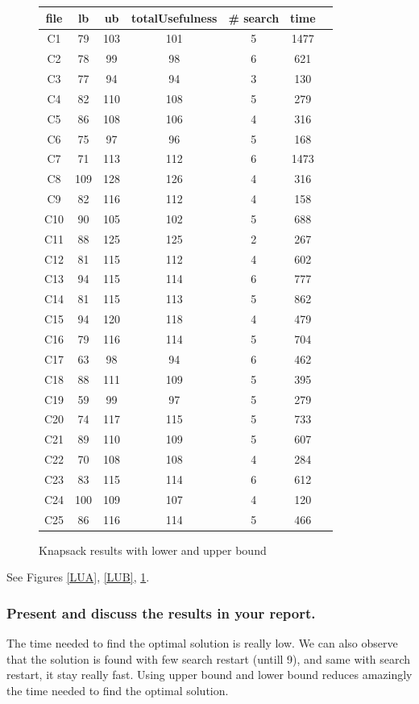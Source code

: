 \documentclass[a4paper ,12pt,french]{article}
\begin{document}
\begin{figure}[!h]
\begin{tabular}{|c|c|c|c|c|c|c|}
\hline
file&lb&ub&totalUsefulness&\# search&time\\
\hline
\hline

C1&79&103&101&5&1477\\\hline
C2&78&99&98&6&621\\\hline
C3&77&94&94&3&130\\\hline
C4&82&110&108&5&279\\\hline
C5&86&108&106&4&316\\\hline
C6&75&97&96&5&168\\\hline
C7&71&113&112&6&1473\\\hline
C8&109&128&126&4&316\\\hline
C9&82&116&112&4&158\\\hline
C10&90&105&102&5&688\\\hline
C11&88&125&125&2&267\\\hline
C12&81&115&112&4&602\\\hline
C13&94&115&114&6&777\\\hline
C14&81&115&113&5&862\\\hline
C15&94&120&118&4&479\\\hline
C16&79&116&114&5&704\\\hline
C17&63&98&94&6&462\\\hline
C18&88&111&109&5&395\\\hline
C19&59&99&97&5&279\\\hline
C20&74&117&115&5&733\\\hline
C21&89&110&109&5&607\\\hline
C22&70&108&108&4&284\\\hline
C23&83&115&114&6&612\\\hline
C24&100&109&107&4&120\\\hline
C25&86&116&114&5&466\\\hline

\end{tabular}
\caption{Knapsack results with lower and upper bound}
\label{LUC}
\end{figure}


See Figures \ref{LUA}, \ref{LUB}, \ref{LUC}.

\subsubsection{Present and discuss the results in your report.}

The time needed to find the optimal solution is really low. We can also observe that the solution is found with few search restart (untill 9), and same with search restart, it stay really fast. Using upper bound and lower bound reduces amazingly the time needed to find the optimal solution. 
\end{document}
